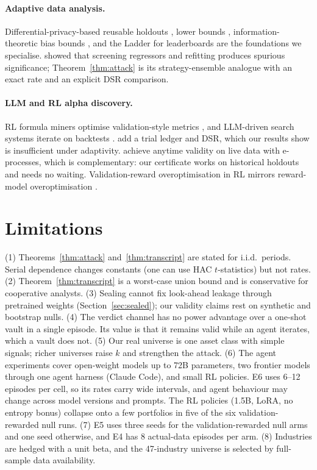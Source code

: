 \documentclass[11pt]{article}
\theoremstyle{definition}
\theoremstyle{remark}
\begin{document}
\paragraph{Adaptive data analysis.} Differential-privacy-based reusable holdouts \citep{dwork2015science,dwork2015generalization,bassily2016algorithmic}, lower bounds \citep{hardt2014preventing}, information-theoretic bias bounds \citep{russo2016controlling,xu2017information}, and the Ladder for leaderboards \citep{blum2015ladder} are the foundations we specialise. \citet{freedman1983note} showed that screening regressors and refitting produces spurious significance; Theorem~\ref{thm:attack} is its strategy-ensemble analogue with an exact rate and an explicit DSR comparison.

\paragraph{LLM and RL alpha discovery.} RL formula miners optimise validation-style metrics \citep{yu2023alphagen}, and LLM-driven search systems iterate on backtests \citep{shi2025alphaforge}. \citet{gencay2026honest} add a trial ledger and DSR, which our results show is insufficient under adaptivity. \citet{qu2026propose} achieve anytime validity on live data with e-processes, which is complementary: our certificate works on historical holdouts and needs no waiting. Validation-reward overoptimisation in RL mirrors reward-model overoptimisation \citep{gao2023scaling}.

\section{Limitations}
(1) Theorems~\ref{thm:attack} and~\ref{thm:transcript} are stated for i.i.d.\ periods. Serial dependence changes constants (one can use HAC $t$-statistics) but not rates. (2) Theorem~\ref{thm:transcript} is a worst-case union bound and is conservative for cooperative analysts. (3) Sealing cannot fix look-ahead leakage through pretrained weights (Section~\ref{sec:sealed}); our validity claims rest on synthetic and bootstrap nulls. (4) The verdict channel has no power advantage over a one-shot vault in a single episode. Its value is that it remains valid while an agent iterates, which a vault does not. (5) Our real universe is one asset class with simple signals; richer universes raise $k$ and strengthen the attack. (6) The agent experiments cover open-weight models up to 72B parameters, two frontier models through one agent harness (Claude Code), and small RL policies. E6 uses 6--12 episodes per cell, so its rates carry wide intervals, and agent behaviour may change across model versions and prompts. The RL policies (1.5B, LoRA, no entropy bonus) collapse onto a few portfolios in five of the six validation-rewarded null runs. (7) E5 uses three seeds for the validation-rewarded null arms and one seed otherwise, and E4 has 8 actual-data episodes per arm. (8) Industries are hedged with a unit beta, and the 47-industry universe is selected by full-sample data availability.
\end{document}

